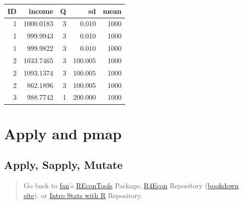 \documentclass[
]{book}
\newenvironment{Shaded}{\begin{snugshade}}{\end{snugshade}}
\newcommand{\KeywordTok}[1]{\textcolor[rgb]{0.13,0.29,0.53}{\textbf{#1}}}
\newcommand{\NormalTok}[1]{#1}
\newcommand{\OperatorTok}[1]{\textcolor[rgb]{0.81,0.36,0.00}{\textbf{#1}}}
\newcommand{\StringTok}[1]{\textcolor[rgb]{0.31,0.60,0.02}{#1}}
\begin{document}
\begin{Shaded}
\end{Shaded}

\begin{table}[!h]
\centering
\begin{tabular}{r|r|r|r|r}
\hline
ID & income & Q & sd & mean\\
\hline
\rowcolor{gray!6}  1 & 1000.0183 & 3 & 0.010 & 1000\\
\hline
1 & 999.9943 & 3 & 0.010 & 1000\\
\hline
\rowcolor{gray!6}  1 & 999.9822 & 3 & 0.010 & 1000\\
\hline
2 & 1033.7465 & 3 & 100.005 & 1000\\
\hline
\rowcolor{gray!6}  2 & 1093.1374 & 3 & 100.005 & 1000\\
\hline
2 & 862.1896 & 3 & 100.005 & 1000\\
\hline
\rowcolor{gray!6}  3 & 988.7742 & 1 & 200.000 & 1000\\
\hline
\end{tabular}
\end{table}

\hypertarget{apply-and-pmap}{%
\section{Apply and pmap}\label{apply-and-pmap}}

\hypertarget{apply-sapply-mutate}{%
\subsection{Apply, Sapply, Mutate}\label{apply-sapply-mutate}}

\begin{quote}
Go back to \href{http://fanwangecon.github.io/}{fan}'s \href{https://fanwangecon.github.io/REconTools/}{REconTools} Package, \href{https://fanwangecon.github.io/R4Econ/}{R4Econ} Repository (\href{https://fanwangecon.github.io/R4Econ/bookdown}{bookdown site}), or \href{https://fanwangecon.github.io/Stat4Econ/}{Intro Stats with R} Repository.
\end{quote}
\end{document}
